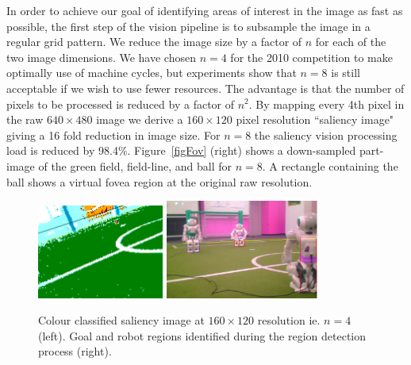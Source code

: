 \documentclass[runningheads,a4paper]{llncs}
\begin{document}
In order to achieve our goal of identifying areas of interest in the image as
fast as possible, the first step of the vision pipeline is to subsample the
image in a regular grid pattern. We reduce the image size by a factor of $n$ for
each of the two image dimensions. We have chosen $n=4$ for the 2010 competition
to make optimally use of machine cycles, but experiments show that $n=8$ is
still acceptable if we wish to use fewer resources. The advantage is that the
number of pixels to be processed is reduced by a factor of $n^2$. By mapping
every 4th pixel in the raw $640 \times 480$ image we derive a $160 \times 120$
pixel resolution ``saliency image" giving a 16 fold reduction in image size. For
$n=8$ the saliency vision processing load is reduced by 98.4\%.
Figure~\ref{figFov} (right) shows a down-sampled part-image of the green field,
field-line, and ball for $n=8$. A rectangle containing the ball shows a virtual
fovea region at the original raw resolution. 

\begin{figure}
\centering
\includegraphics[width=0.37\textwidth]{figures/figSal}
\includegraphics[width=0.45\textwidth]{figures/robotDetectionScreenshot.png}
\caption{Colour classified saliency image at $160 \times 120$ resolution  ie.
$n=4$ (left). Goal and robot regions identified
during the region detection process (right).} \label{figSal}
\end{figure}
\end{document}
